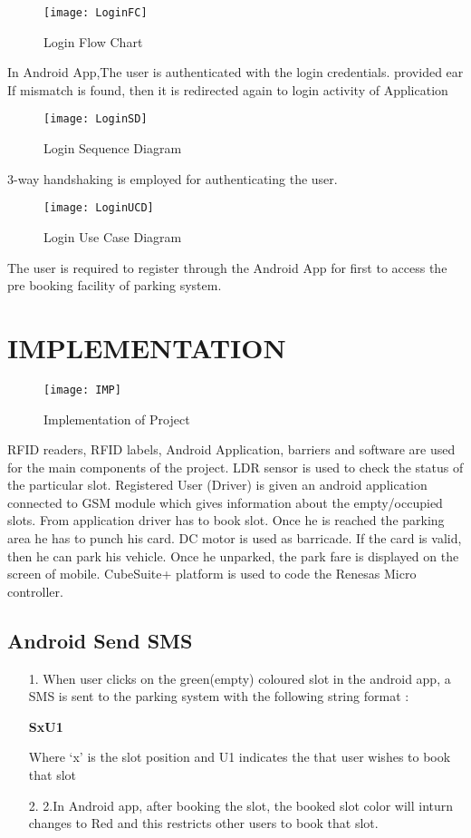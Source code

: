 \documentclass[12pt,a4paper]{report}
\begin{document}
\begin{figure}[H]
	\begin{center}
		\texttt{[image: LoginFC]}
		\caption{Login Flow Chart}
	\end{center}
\end{figure}
In Android App,The user is authenticated with the login credentials. provided ear If mismatch is found, then it is redirected again to login activity of Application
\begin{figure}[H]
	\begin{center}
		\texttt{[image: LoginSD]}
		\caption{Login Sequence Diagram}
	\end{center}
\end{figure}
3-way handshaking is employed for authenticating the user.
\begin{figure}[H]
	\begin{center}
		\texttt{[image: LoginUCD]}
		\caption{Login Use Case Diagram}
	\end{center}
\end{figure}

The user is required to register through the Android App for first to access the pre booking facility of parking system.

\chapter{IMPLEMENTATION}
\newpage
	\begin{figure}[H]
		\begin{center}
\texttt{[image: IMP]}
	\caption{Implementation of Project}
\end{center}
\end{figure}
RFID readers, RFID labels, Android Application, barriers and software are used  for the main components of the project. LDR sensor is used to check the status of the particular slot. Registered User (Driver) is given an android application connected to GSM module which gives information about the empty/occupied slots. From application driver has to book slot. Once he is reached the parking area he has to punch his card. DC motor is used as barricade. If the card is valid, then he can park his vehicle. Once he unparked, the park fare is displayed on the screen of mobile. CubeSuite+ platform is used to code the Renesas Micro controller.
\section{Android Send SMS}
\begin{itemize}
	\item [1.]When user clicks on the green(empty)  coloured slot in the android app, a SMS is sent to the parking system with the following string format :
	\begin{center}
		\textbf{SxU1}
	\end{center}
Where ‘x’ is the slot position and U1 indicates the that user wishes to book that slot 
	\item [2.]2.In Android app, after booking the slot, the booked slot color will inturn changes to Red and this restricts other users to book that slot.
\end{itemize}
\end{document}
